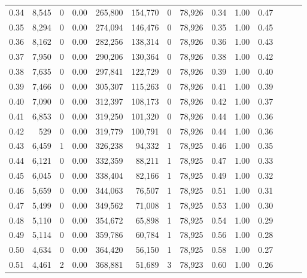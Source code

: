 \begin{tabular}{rrrrrrrrrrrrrr}
0.34 &   8,545 &      0 &  0.00 &  265,800 &  154,770 &       0 &  78,926 &  0.34 &  1.00 &      0.47 \\
0.35 &   8,294 &      0 &  0.00 &  274,094 &  146,476 &       0 &  78,926 &  0.35 &  1.00 &      0.45 \\
0.36 &   8,162 &      0 &  0.00 &  282,256 &  138,314 &       0 &  78,926 &  0.36 &  1.00 &      0.43 \\
0.37 &   7,950 &      0 &  0.00 &  290,206 &  130,364 &       0 &  78,926 &  0.38 &  1.00 &      0.42 \\
0.38 &   7,635 &      0 &  0.00 &  297,841 &  122,729 &       0 &  78,926 &  0.39 &  1.00 &      0.40 \\
0.39 &   7,466 &      0 &  0.00 &  305,307 &  115,263 &       0 &  78,926 &  0.41 &  1.00 &      0.39 \\
0.40 &   7,090 &      0 &  0.00 &  312,397 &  108,173 &       0 &  78,926 &  0.42 &  1.00 &      0.37 \\
0.41 &   6,853 &      0 &  0.00 &  319,250 &  101,320 &       0 &  78,926 &  0.44 &  1.00 &      0.36 \\
0.42 &     529 &      0 &  0.00 &  319,779 &  100,791 &       0 &  78,926 &  0.44 &  1.00 &      0.36 \\
0.43 &   6,459 &      1 &  0.00 &  326,238 &   94,332 &       1 &  78,925 &  0.46 &  1.00 &      0.35 \\
0.44 &   6,121 &      0 &  0.00 &  332,359 &   88,211 &       1 &  78,925 &  0.47 &  1.00 &      0.33 \\
0.45 &   6,045 &      0 &  0.00 &  338,404 &   82,166 &       1 &  78,925 &  0.49 &  1.00 &      0.32 \\
0.46 &   5,659 &      0 &  0.00 &  344,063 &   76,507 &       1 &  78,925 &  0.51 &  1.00 &      0.31 \\
0.47 &   5,499 &      0 &  0.00 &  349,562 &   71,008 &       1 &  78,925 &  0.53 &  1.00 &      0.30 \\
0.48 &   5,110 &      0 &  0.00 &  354,672 &   65,898 &       1 &  78,925 &  0.54 &  1.00 &      0.29 \\
0.49 &   5,114 &      0 &  0.00 &  359,786 &   60,784 &       1 &  78,925 &  0.56 &  1.00 &      0.28 \\
0.50 &   4,634 &      0 &  0.00 &  364,420 &   56,150 &       1 &  78,925 &  0.58 &  1.00 &      0.27 \\
0.51 &   4,461 &      2 &  0.00 &  368,881 &   51,689 &       3 &  78,923 &  0.60 &  1.00 &      0.26 \\

\end{tabular}
